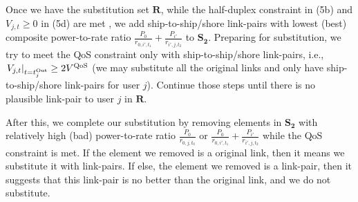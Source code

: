 \documentclass[journal]{IEEEtran}
\begin{document}
 Once we have the substitution set $\mathbf{R}$, while the half-duplex constraint in (5b) and ${V_{j,t}} \ge 0$ in (5d) are met%
 , we add ship-to-ship/shore link-pairs with lowest (best) composite power-to-rate ratio $ {\frac{{{P_0}}}{{{r_{0,i',{t_1}}}}} + \frac{{{P_{i'}}}}{{{r_{i',j,{t_2}}}}}} $ to ${{\mathbf{S}}_{\mathbf{2}}}$. Preparing for substitution, we try to meet the QoS constraint only with ship-to-ship/shore link-pairs, i.e., ${\left. {{V_{j,t}}} \right|_{t = t_j^{{\rm{Out}}}}} \ge 2{V^{\rm{QoS}}}$ (we may substitute all the original links and only have ship-to-ship/shore link-pairs for user $j$). 
 Continue those steps until there is no plausible link-pair to user $j$ in $\mathbf{R}$. %

 After this, we complete our substitution by removing elements in ${{\mathbf{S}}_{\mathbf{2}}}$ with relatively high (bad) power-to-rate ratio ${\frac{P_0}{r_{0,j,{t_0}}}}$ or $ {\frac{{{P_0}}}{{{r_{0,i',{t_1}}}}} + \frac{{{P_{i'}}}}{{{r_{i',j,{t_2}}}}}} $ while the QoS constraint is met. If the element we removed is a original link, then it means we substitute it with link-pairs. If else, the element we removed is a link-pair, then it suggests that this link-pair is no better than the original link, and we do not substitute. 
\end{document}
